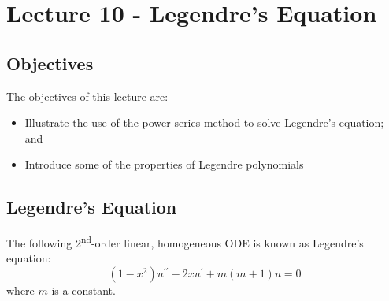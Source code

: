 \chapter{Lecture 10 - Legendre's Equation}
\label{ch:lec10}
\section{Objectives}
The objectives of this lecture are:
\begin{itemize}
\item Illustrate the use of the power series method to solve Legendre's equation; and 
\item Introduce some of the properties of Legendre polynomials
\end{itemize}

\section{Legendre's Equation}
The following 2\textsuperscript{nd}-order linear, homogeneous ODE is known as Legendre's equation:
\begin{equation}
\left(1-x^2 \right)u^{\prime \prime}-2xu^{\prime} + m(m+1)u = 0 
\label{eq:legendre}
\end{equation}
where $m$ is a constant.

